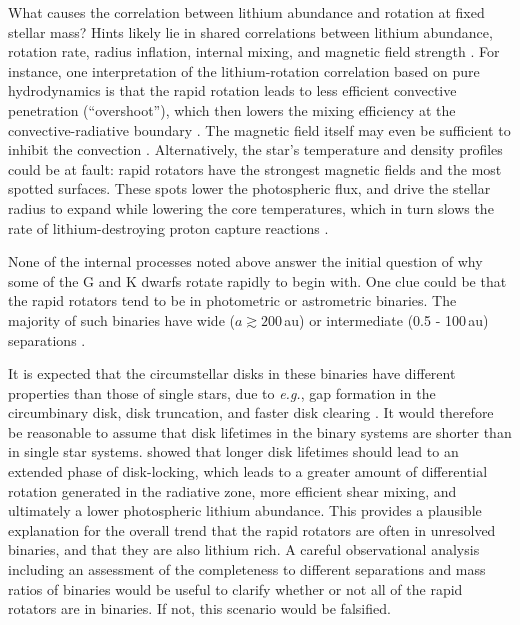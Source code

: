 \documentclass[12pt,twocolumn,tighten]{aastex63}
\begin{document}
What causes the correlation between lithium abundance and rotation at
fixed stellar mass?  Hints likely lie in shared correlations between lithium
abundance, rotation rate, radius inflation, internal mixing, and
magnetic field strength
\citep{chabrier_evolution_2007,somers_measurement_2017,jeffries_m35_li_2020}.
For instance, one interpretation of the lithium-rotation correlation
based on pure hydrodynamics is that the rapid rotation leads to less
efficient convective penetration (``overshoot''), which then lowers the mixing
efficiency at the convective-radiative boundary
\citep{baraffe_lithium_2017}.  The magnetic field itself may even be
sufficient to inhibit the convection \citep{ventura_Li_B_1998}.
Alternatively, the star's temperature and density profiles could be at fault: rapid rotators
have the strongest magnetic fields and the most spotted surfaces.
These spots lower the photospheric flux, and drive the stellar radius
to expand while lowering the core temperatures, which in turn slows
the rate of lithium-destroying proton capture reactions
\citep{feiden_magnetic_2013,somers_rotation_2015}.  

None of the internal processes noted above answer the initial
question of why some of the G and K dwarfs rotate rapidly to begin
with.  One clue could be that the rapid rotators tend to be in
photometric or astrometric binaries.  The majority of such binaries
have wide ($a\gtrsim200$\,au) or intermediate (0.5 - 100\,au)
separations \citep{raghavan_survey_2010}.

It is expected that the circumstellar disks in these binaries have
different properties than those of single stars, due to {\it e.g.}, gap
formation in the circumbinary disk, disk truncation, and faster disk
clearing \citep{artymowicz_dynamics_1994,moe_impact_2020}.  It would
therefore be reasonable to assume that disk lifetimes in the binary
systems are shorter than in single star systems.
\citet{eggenberger_impact_2012} showed that longer disk lifetimes
should lead to an extended phase of disk-locking, which leads to a
greater amount of differential rotation generated in the radiative
zone, more efficient shear mixing, and ultimately a lower photospheric
lithium abundance.  This provides a plausible explanation for the
overall trend that the rapid rotators are often in unresolved
binaries, and that they are also lithium rich.  A careful
observational analysis including an assessment of the completeness to
different separations and mass ratios of binaries would be useful to
clarify whether or not all of the rapid rotators are in binaries.  If
not, this scenario would be falsified.
\end{document}
